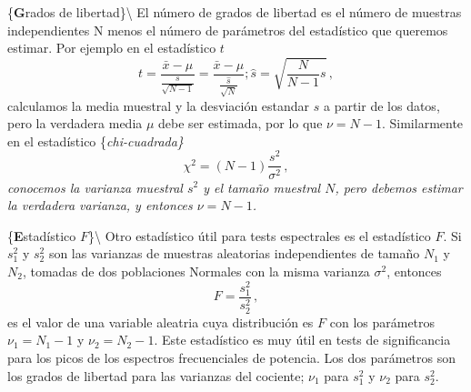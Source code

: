 \documentclass[
]{agujournal2019}
\begin{document}
\vspace{0.5cm}

\{\noindent \textbf Grados de libertad\}\textbackslash{} El número de
grados de libertad es el número de muestras independientes N menos el
número de parámetros del estadístico que queremos estimar. Por ejemplo
en el estadístico \(t\)
\[t=\frac{\bar{x}-\mu}{\frac{s}{\sqrt{N-1}}}=\frac{\bar{x}-\mu}{\frac{\hat{s}}{\sqrt{N}}};
\hat{s}=\sqrt{\frac{N}{N-1}s}\,,\] calculamos la media muestral y la
desviación estandar \(s\) a partir de los datos, pero la verdadera media
\(\mu\) debe ser estimada, por lo que \(\nu=N-1\). Similarmente en el
estadístico \{\it chi-cuadrada\} \[\chi^2=(N-1)\frac{s^2}{\sigma^2}\,,\]
conocemos la varianza muestral \(s^2\) y el tamaño muestral \(N\), pero
debemos estimar la verdadera varianza, y entonces \(\nu=N-1\).

\vspace{0.5cm}

\{\noindent \textbf Estadístico \(F\)\}\textbackslash{} Otro estadístico
útil para tests espectrales es el estadístico \(F\). Si \(s^2_1\) y
\(s^2_2\) son las varianzas de muestras aleatorias independientes de
tamaño \(N_1\) y \(N_2\), tomadas de dos poblaciones Normales con la
misma varianza \(\sigma^2\), entonces \[F=\frac{s^2_1}{s^2_2}\,,\] es el
valor de una variable aleatria cuya distribución es \(F\) con los
parámetros \(\nu_1=N_1-1\) y \(\nu_2=N_2-1\). Este estadístico es muy
útil en tests de significancia para los picos de los espectros
frecuenciales de potencia. Los dos parámetros son los grados de libertad
para las varianzas del cociente; \(\nu_1\) para \(s^2_1\) y \(\nu_2\)
para \(s^2_2\).

\vspace{0.5cm}
\end{document}
